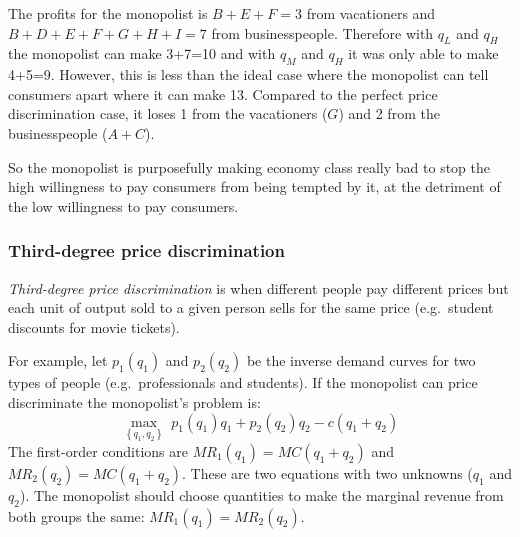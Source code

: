 \documentclass{article}
\begin{document}
The profits for the monopolist is $B+E+F=3$ from vacationers and $B+D+E+F+G+H+I=7$ from businesspeople. Therefore with $q_L$ and $q_H$ the monopolist can make 3+7=10 and with $q_M$ and $q_H$ it was only able to make 4+5=9. However, this is less than the ideal case where the monopolist can tell consumers apart where it can make 13. Compared to the perfect price discrimination case, it loses 1 from the vacationers ($G$) and 2 from the businesspeople ($A+C$).

\begin{center}
\end{center}
So the monopolist is purposefully making economy class really bad to stop the high willingness to pay consumers from being tempted by it, at the detriment of the low willingness to pay consumers.
\subsubsection*{Third-degree price discrimination}
\vspace{-1mm}
\emph{Third-degree price discrimination} is when different people pay different
prices but each unit of output sold to a given person sells for the same price
(e.g.~student discounts for movie tickets).

For example, let $p_1\left(q_1  \right)$ and $p_2\left( q_2 \right)$ be the
inverse demand curves for two types of people (e.g.~professionals and
students). If the monopolist can price discriminate the monopolist's problem
is:
\vspace{-2mm}
\[
  \underset{\left\{q_1,q_2  \right\}}{\max}\;p_1\left( q_1 \right)q_1+ p_2\left(
  q_2 \right)q_2 - c\left( q_1+q_2 \right)
\]
The first-order conditions are $MR_1\left( q_1 \right)=MC\left( q_1+q_2
\right)$ and $MR_2\left( q_2 \right)=MC\left( q_1+q_2 \right)$. These are two
equations with two unknowns ($q_1$ and $q_2$).
The monopolist should choose quantities to make the marginal revenue
from both groups the same: $MR_1\left(  q_1 \right)=MR_2\left( q_2 \right)$.
\end{document}
